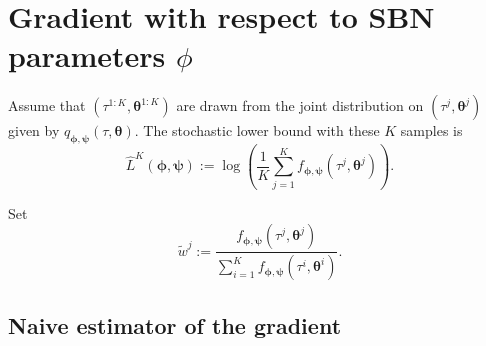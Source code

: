 \documentclass{article}
\begin{document}
\section*{Gradient with respect to SBN parameters $\phi$}

Assume that $(\tau^{1:K}, \bm \theta^{1:K})$ are drawn from the joint distribution on $(\tau^j, \bm \theta^j)$ given by $q_{\bm{\phi},\bm{\psi}}(\tau, \bm{\theta})$.
The stochastic lower bound with these $K$ samples is
\[
    \hat{L}^K(\bm{\phi},{\bm{\psi}}) :=
    \log\left( \frac{1}{K} \sum_{j=1}^K f_{\bm{\phi},{\bm{\psi}}}(\tau^j, \bm \theta^j) \right).
\]

Set
\[
    \tilde{w}^j :=
    \frac{f_{\bm{\phi},{\bm{\psi}}}(\tau^j, \bm \theta^j)}
    {\sum_{i=1}^K f_{\bm{\phi},{\bm{\psi}}}(\tau^i, \bm \theta^i)}.
\]

\subsection*{Naive estimator of the gradient}
\end{document}
